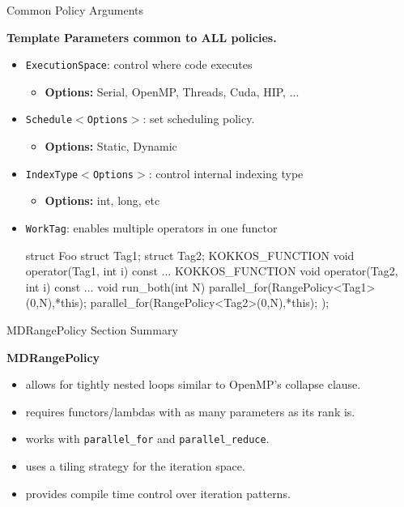 \begin{frame}[fragile]{Common Policy Arguments}

  \textbf{Template Parameters common to ALL policies.}

  \begin{itemize}
     \item \texttt{ExecutionSpace}: control where code executes
     \begin{itemize}
       \item{\small{\textbf{Options:} Serial, OpenMP, Threads, Cuda, HIP, ...}}
     \end{itemize}
     \item \texttt{Schedule$<$Options$>$}: set scheduling policy.
     \begin{itemize}
        \item{\small{\textbf{Options:} Static, Dynamic}}
     \end{itemize}

     \item \texttt{IndexType$<$Options$>$}: control internal indexing type
     \begin{itemize}
       \item{\small{\textbf{Options:} int, long, etc}}
     \end{itemize}

     \item \texttt{WorkTag}: enables multiple operators in one functor
	     \begin{code}[keywords={struct,Tag1,Tag2,void,int}]
struct Foo {
  struct Tag1{}; struct Tag2{};
  KOKKOS_FUNCTION void operator(Tag1, int i) const {...}
  KOKKOS_FUNCTION void operator(Tag2, int i) const {...}
  void run_both(int N) { 
    parallel_for(RangePolicy<Tag1>(0,N),*this);
    parallel_for(RangePolicy<Tag2>(0,N),*this);
  }
});
  \end{code}
  \end{itemize}

\end{frame}


\begin{frame}[fragile]{MDRangePolicy Section Summary}

  \textbf{MDRangePolicy}
  \begin{itemize}
    \item{allows for tightly nested loops similar to OpenMP's collapse clause.}
    \item{requires functors/lambdas with as many parameters as its rank is.}
    \item{works with \texttt{parallel\_for} and \texttt{parallel\_reduce}.}
    \item{uses a tiling strategy for the iteration space.}
    \item{provides compile time control over iteration patterns.}
  \end{itemize}

\end{frame}

